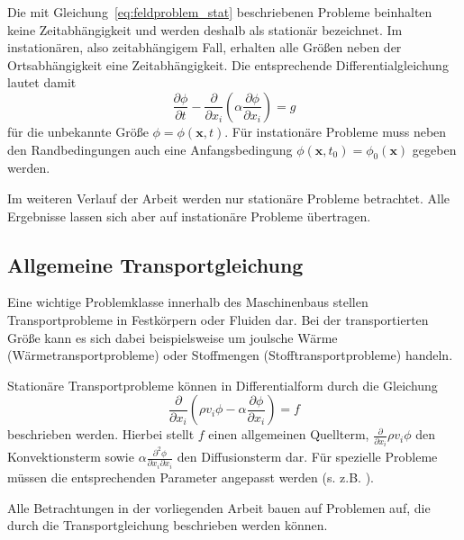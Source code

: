 Die mit Gleichung~\eqref{eq:feldproblem_stat} beschriebenen Probleme beinhalten keine Zeitabhängigkeit
und werden deshalb als stationär bezeichnet.
Im instationären, also zeitabhängigem Fall, erhalten alle Größen neben der Ortsabhängigkeit
eine Zeitabhängigkeit. Die entsprechende Differentialgleichung lautet damit
\begin{equation}
  \frac{\partial \phi}{\partial t}
  -\frac{\partial}{\partial x_i}\left({\alpha \frac{\partial \phi}{\partial x_i} }\right)=g
  \label{eq:feldproblem_instat}
\end{equation}
für die unbekannte Größe $\phi=\phi(\mathbf{x}, t)$.
Für instationäre Probleme muss neben den Randbedingungen auch eine Anfangsbedingung
$\phi(\mathbf{x}, t_0) = \phi_0(\mathbf{x})$ gegeben werden.

Im weiteren Verlauf der Arbeit werden nur stationäre Probleme betrachtet. Alle Ergebnisse
lassen sich aber auf instationäre Probleme übertragen.

\subsection{Allgemeine Transportgleichung}
\label{sec:transportgl}

Eine wichtige Problemklasse innerhalb des Maschinenbaus stellen Transportprobleme in
Festkörpern oder Fluiden dar. Bei der transportierten Größe kann es sich dabei beispielsweise
um joulsche Wärme (Wärmetransportprobleme) oder Stoffmengen (Stofftransportprobleme) handeln.

Stationäre Transportprobleme können in Differentialform durch die Gleichung
\begin{equation}
  \frac{\partial}{\partial x_i} \left({\rho v_i \phi
- \alpha \frac{\partial \phi}{\partial x_i} }\right) = f
\label{eq:transportgl}
\end{equation}
beschrieben werden. Hierbei stellt $f$ einen allgemeinen Quellterm,
$\frac{\partial}{\partial x_i} \rho v_i \phi$ den Konvektionsterm sowie
$\alpha \frac{\partial^2 \phi}{\partial x_i \partial x_i}$ den Diffusionsterm dar.
Für spezielle Probleme müssen die entsprechenden Parameter angepasst werden (s. z.B. \cite{num_maschbau}).

Alle Betrachtungen in der vorliegenden Arbeit bauen auf Problemen auf, die durch die
Transportgleichung beschrieben werden können.
